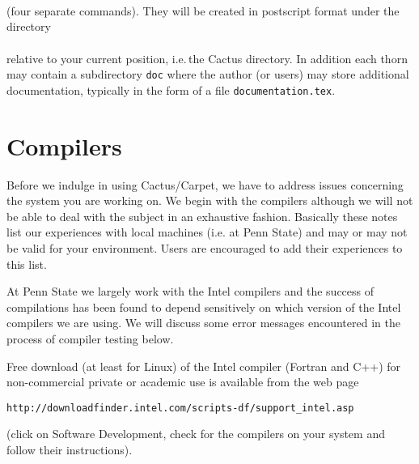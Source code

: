 \documentclass[11pt]{article}
\numberwithin{equation}{section}
\begin{document}
\hspace{1cm}{\tt make ReferenceManual}\\

\hspace{1cm}{\tt make ArrangementDoc}\\

\hspace{1cm}{\tt make ThornDoc}\\

(four separate commands). They will be created in postscript format under
the directory\\

\hspace{1cm}{\tt doc}\\

relative to your current position, i.e.\,the {\rm Cactus} directory.
In addition each thorn may contain a subdirectory {\tt doc} where
the author (or users) may store additional documentation, typically
in the form of a file {\tt documentation.tex}.


\section{Compilers}

Before we indulge in using Cactus/Carpet, we have to address issues
concerning the system you are working on. We begin with the compilers
although we will not be able to deal with the subject in an exhaustive
fashion.
Basically these notes list our experiences with local machines
(i.e. at Penn State) and may or may not be valid for your environment.
Users are encouraged to add their experiences to this list.

At Penn State we largely work with the Intel compilers and the success
of compilations has been found to depend sensitively on which version of the
Intel compilers we are using. We will discuss some error messages
encountered in the process of compiler testing below.

Free download (at least for Linux) of
the Intel compiler (Fortran and C++) for
non-commercial private or academic use is available from the web page
%
\begin{center}
  {\tt http://downloadfinder.intel.com/scripts-df/support\_intel.asp}
\end{center}
%
(click on Software Development, check for the compilers on your system
and follow their instructions).
\end{document}
